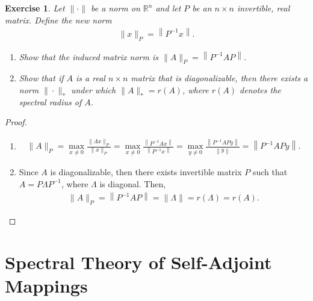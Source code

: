 \documentclass[11pt]{book}
\newtheorem{exercise}{Exercise}[section]
\theoremstyle{definition}
\numberwithin{equation}{chapter}
\begin{document}
\begin{exercise}{\rm *}
Let $\|\cdot \|$ be a norm on $\mathbb{R}^n$ and let $P$ be an $n \times n$ invertible, real matrix. Define the new norm 
\begin{align*}
    \|x\|_P = \left\|P^{-1}x\right\|.
\end{align*}
\begin{enumerate}[label=(\alph*)]
    \item Show that the induced matrix norm is $\|A\|_P = \left\|P^{-1}AP\right\|$.
    
    \item Show that if $A$ is a real $n \times n$ matrix that is diagonalizable, then there exists a norm $\|\cdot \|_*$ under which $\|A\|_* = r(A)$, where $r(A)$ denotes the spectral radius of $A$.
\end{enumerate}
\end{exercise}
\begin{proof}
~\begin{enumerate}[label=(\alph*)]
    \item \begin{align*}
        \|A\|_P = \max_{x \neq 0} \frac{\|Ax\|_P}{\|x\|_P} = \max_{x \neq 0} \frac{\left\|P^{-1}Ax\right\|}{\left\|P^{-1}x\right\|} = \max_{y \neq 0} \frac{\left\|P^{-1}APy\right\|}{\left\|y\right\|} = \left\|P^{-1}APy\right\|.
    \end{align*}
    
    \item Since $A$ is diagonalizable, then there exists invertible matrix $P$ such that $A = P\Lambda P^{-1}$, where $\Lambda$ is diagonal. Then,
    \begin{align*}
        \|A\|_P = \left\|P^{-1} A P\right\| = \|\Lambda \| = r(\Lambda) = r(A).
    \end{align*}
\end{enumerate}
\end{proof}


\section{Spectral Theory of Self-Adjoint Mappings}
\end{document}
